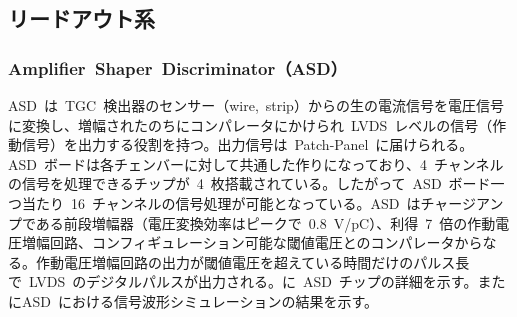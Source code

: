 \subsection{リードアウト系}
\subsubsection{Amplifier~Shaper~Discriminator（ASD）}
\label{subsubsec:ASD}
ASD~は~TGC~検出器のセンサー（wire,~strip）からの生の電流信号を電圧信号に変換し、増幅されたのちにコンパレータにかけられ~LVDS~レベルの信号（作動信号）を出力する役割を持つ。出力信号は~Patch-Panel~に届けられる。ASD~ボードは各チェンバーに対して共通した作りになっており、4~チャンネルの信号を処理できるチップが~4~枚搭載されている。したがって~ASD~ボード一つ当たり~16~チャンネルの信号処理が可能となっている。ASD~はチャージアンプである前段増幅器（電圧変換効率はピークで~0.8~V/pC）、利得~7~倍の作動電圧増幅回路、コンフィギュレーション可能な閾値電圧とのコンパレータからなる。作動電圧増幅回路の出力が閾値電圧を超えている時間だけのパルス長で~LVDS~のデジタルパルスが出力される。に~ASD~チップの詳細を示す。またにASD~における信号波形シミュレーションの結果を示す。

